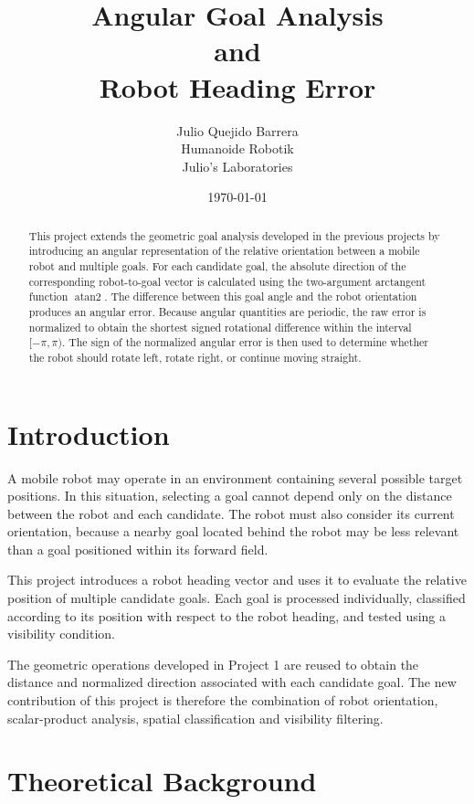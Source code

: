 \documentclass[10pt,twocolumn,a4paper]{article}
\title{
    \textbf{Angular Goal Analysis\\
    and\\
    Robot Heading Error}
}
\author{
    Julio Quejido Barrera\\
    Humanoide Robotik\\
    Julio's Laboratories
}
\date{\today}
\begin{document}

\maketitle

\begin{abstract}
This project extends the geometric goal analysis developed 
in the previous projects by introducing an angular representation 
of the relative orientation between a mobile robot and multiple goals. 
For each candidate goal, the absolute direction of the corresponding 
robot-to-goal vector is calculated using the two-argument arctangent 
function $\operatorname{atan2}$. The difference between this goal angle 
and the robot orientation produces an angular error. Because angular 
quantities are periodic, the raw error is normalized to obtain the 
shortest signed rotational difference within the interval $[-\pi,\pi)$. 
The sign of the normalized angular error is then used to determine 
whether the robot should rotate left, rotate right, or continue moving 
straight.
\end{abstract}

\section{Introduction}

A mobile robot may operate in an environment containing 
several possible target positions. In this situation, 
selecting a goal cannot depend only on the distance 
between the robot and each candidate. The robot must 
also consider its current orientation, because a nearby 
goal located behind the robot may be less relevant than 
a goal positioned within its forward field.

This project introduces a robot heading vector and uses 
it to evaluate the relative position of multiple candidate 
goals. Each goal is processed individually, classified 
according to its position with respect to the robot heading, 
and tested using a visibility condition.

The geometric operations developed in Project 1 are reused 
to obtain the distance and normalized direction associated 
with each candidate goal. The new contribution of this project 
is therefore the combination of robot orientation, scalar-product 
analysis, spatial classification and visibility filtering.

\section{Theoretical Background}
\end{document}

